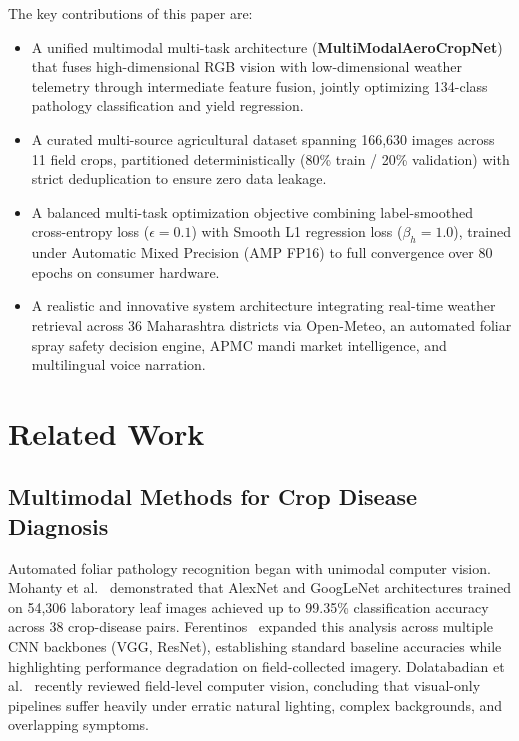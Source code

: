\documentclass[conference]{IEEEtran}
\begin{document}
The key contributions of this paper are:
\begin{itemize}
    \item A unified multimodal multi-task architecture (\textbf{MultiModalAeroCropNet}) that fuses high-dimensional RGB vision with low-dimensional weather telemetry through intermediate feature fusion, jointly optimizing 134-class pathology classification and yield regression.
    \item A curated multi-source agricultural dataset spanning 166,630 images across 11 field crops, partitioned deterministically (80\% train / 20\% validation) with strict deduplication to ensure zero data leakage.
    \item A balanced multi-task optimization objective combining label-smoothed cross-entropy loss ($\epsilon = 0.1$) with Smooth L1 regression loss ($\beta_h = 1.0$), trained under Automatic Mixed Precision (AMP FP16) to full convergence over 80 epochs on consumer hardware.
    \item A realistic and innovative system architecture integrating real-time weather retrieval across 36 Maharashtra districts via Open-Meteo, an automated foliar spray safety decision engine, APMC mandi market intelligence, and multilingual voice narration.
\end{itemize}

\section{Related Work}

\subsection{Multimodal Methods for Crop Disease Diagnosis}

Automated foliar pathology recognition began with unimodal computer vision. Mohanty et al.~\cite{mohanty2016} demonstrated that AlexNet and GoogLeNet architectures trained on 54,306 laboratory leaf images achieved up to 99.35\% classification accuracy across 38 crop-disease pairs. Ferentinos~\cite{ferentinos2018} expanded this analysis across multiple CNN backbones (VGG, ResNet), establishing standard baseline accuracies while highlighting performance degradation on field-collected imagery. Dolatabadian et al.~\cite{dolatabadian2025} recently reviewed field-level computer vision, concluding that visual-only pipelines suffer heavily under erratic natural lighting, complex backgrounds, and overlapping symptoms.
\end{document}
